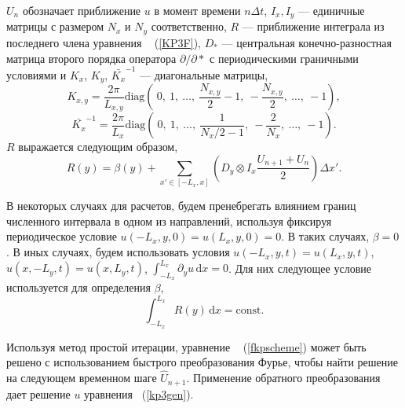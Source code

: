 $ U_n $ обозначает приближение $ u $ в момент времени $ n \Delta t $, $ I_x, I_y $ --- единичные матрицы с размером $ N_x $ и $ N_y $ соответственно, $ R $ --- приближение интеграла из последнего члена уравнения ~ (\ref{KP3F}), $ D_* $ --- центральная конечно-разностная матрица второго порядка оператора $ \partial / \partial *$ с периодическими граничными условиями и $ K_x $, $ K_y $, $ \bar {K_x}^{-1} $ --- диагональные матрицы,
$$
K_{x,y} = \frac{2 \pi}{L_{x,y}} \text{diag} \left( ~0, ~1, ~\dots, ~\frac{N_{x,y}}{2}-1, ~-\frac{N_{x,y}}{2}, ~\dots, ~-1 \right),
$$
$$
\bar{K_x}^{-1}= \frac{2 \pi}{L_x} \text{diag} \left( ~0, ~1, ~\dots, ~\frac{1}{N_{x}/2-1}, ~-\frac{2}{N_x}, ~\dots, ~-1 \right).
$$
$R$ выражается следующим образом,
\begin{equation}
	R(y) = \beta(y) + \sum_{x' \in \left[ -L_x, x\right]} \left(D_y \otimes I_x \frac{U_{n+1} + U_{n}}{2}\right) \Delta x'.
	\label{termRY}
\end{equation}

В некоторых случаях для расчетов, будем пренебрегать влиянием границ численного интервала в одном из направлений, используя фиксируя периодическое условие $u (-L_x, y, 0) = u (L_x, y, 0) = 0$. В таких случаях, $\beta = 0$. В иных случаях, будем использовать условия $ u (-L_x, y, t) = u (L_x, y, t) $, $ u (x, -L_y, t) = u (x, L_y, t) $, $\int_{-L_x}^{L_x} \partial_y u \,\mathrm{d}x = 0$. Для них следующее условие используется для определения $ \beta $,
\begin{equation}
	\label{condperidoic}
	\int_{-L_x}^{L_x} R(y)\, \mathrm{d}x = \text{const}. 
\end{equation}

Используя метод простой итерации, уравнение ~ (\ref{fkpscheme}) может быть решено с использованием быстрого преобразования Фурье, чтобы найти решение на следующем временном шаге $ \hat {U}_{n + 1} $. Применение обратного преобразования дает решение $ u $ уравнения ~(\ref{kp3gen}).

